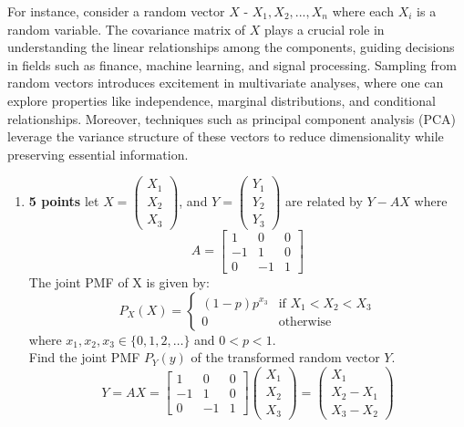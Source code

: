 \documentclass[a3paper,12pt]{extarticle} %
\begin{document}
For instance, consider a random vector \(X\) - \(X_1, X_2,...,X_n\) where each \(X_i\) is a random variable. The covariance matrix of \(X\) plays a crucial role in understanding the linear relationships among the
components, guiding decisions in fields such as finance, machine learning, and signal processing.
Sampling from random vectors introduces excitement in multivariate analyses, where one can explore
properties like independence, marginal distributions, and conditional relationships. Moreover, techniques
such as principal component analysis (PCA) leverage the variance structure of these vectors to reduce
dimensionality while preserving essential information.
\begin{enumerate}
    \item \textbf{5 points} let \(X = \begin{pmatrix}X_1\\X_2 \\X_3\end{pmatrix}\), and \(Y = \begin{pmatrix}Y_1\\Y_2 \\Y_3\end{pmatrix}\)  are related by \(Y - AX\) where
    \[A = \begin{bmatrix}1 & 0 & 0\\-1 & 1 & 0\\0 & -1 & 1\end{bmatrix}\]
    The joint PMF of X is given by:
    \[
    P_X(X) = 
    \begin{cases} 
    (1-p)p^{x_3} & \text{if } X_1 < X_2 < X_3 \\
    0 & \text{otherwise}
    \end{cases}
    \]
    where \(x_1, x_2, x_3 \in \{0, 1, 2, \ldots\}\) and \(0 < p < 1\).
    \\ Find the joint PMF \(P_Y(y)\) of the transformed random vector \(Y\).
    \[
    Y = AX = \begin{bmatrix}1 & 0 & 0\\-1 & 1 & 0\\0 & -1 & 1\end{bmatrix} \begin{pmatrix}X_1\\X_2 \\X_3\end{pmatrix} = \begin{pmatrix}X_1\\X_2 - X_1 \\X_3 - X_2\end{pmatrix}
\]
\end{enumerate}
\end{document}
